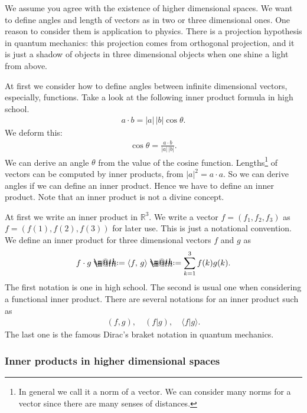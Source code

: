 \documentclass[openany, a4paper, oneside]{book}
\makeatletter
\newcommand*{\defeq}{\mathrel{\rlap{%
\raisebox{0.3ex}{$\m@th\cdot$}}%
\raisebox{-0.3ex}{$\m@th\cdot$}}%
=}
\theoremstyle{break}
\theoremstyle{breakdefn}
\newcommand{\abs}[1]{\left|#1\right|}
\newcommand{\rbk}[1]{\left (#1\right)}
\newcommand{\bkt}[2]{\left\langle#1,\,#2\right\rangle}
\newcommand{\bbR}{\mathbb{R}}
\makeatother
\begin{document}
We assume you agree with the existence of higher dimensional spaces.
We want to define angles and length of vectors as in two or three dimensional ones.
One reason to consider them is application to physics.
There is a projection hypothesis in quantum mechanics:
this projection comes from orthogonal projection,
and it is just a shadow of objects in three dimensional objects when
one shine a light from above.

At first we consider how to define angles between infinite dimensional vectors,
especially, functions.
Take a look at the following inner product formula in high school.
\begin{align}
 a \cdot b
 =
 \abs{a} \, \abs{b} \cos \theta.
\end{align}
We deform this:
\begin{align}
 \cos \theta
 =
 \frac{ a \cdot b} {\abs{a} \, \abs{b}}.
\end{align}
We can derive an angle $\theta$ from the value of the cosine function.
Lengths\footnote{In general we call it a norm of a vector.
We can consider many norms for a vector since there are many senses of distances.
 } of vectors can be computed by inner products,
from $\abs{a}^2 = a \cdot a$.
So we can derive angles if we can define an inner product.
Hence we have to define an inner product.
Note that an inner product is not a divine concept.

At first we write an inner product in $\bbR^3$.
We write a vector $f = (f_1, f_2, f_3)$ as $f = (f(1), f(2), f(3))$ for later use.
This is just a notational convention.
We define an inner product for three dimensional vectors $f$ and $g$ as
\begin{align}
 f \cdot g
 \defeq
 \bkt{f}{g}
 \defeq
 \sum_{k=1}^3 f(k)g(k).
\end{align}
The first notation is one in high school.
The second is usual one when considering a functional inner product.
There are several notations for an inner product such as
\begin{align}
 \rbk{f, g}, \quad \rbk{f | g}, \quad \langle f | g \rangle.
\end{align}
The last one is the famous Dirac's braket notation in quantum mechanics.
\subsubsection{Inner products in higher dimensional spaces}
\label{sec-4-1-3-1-1}
\end{document}
